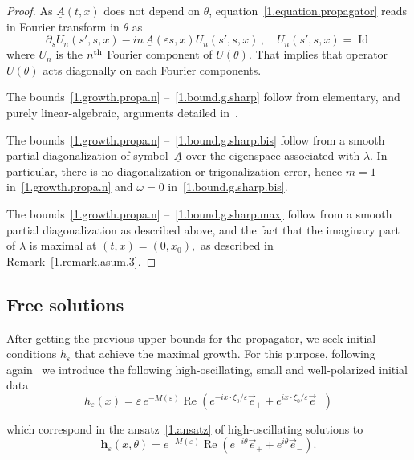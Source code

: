 \documentclass[10pt]{amsart}
\theoremstyle{definition}
\theoremstyle{plain}
\newcommand*\e{\varepsilon}
\newcommand{\dptl}{\partial}%
\newcommand*\h{{\mathbf h}}
\newcommand*\und{\underline}
\DeclareMathOperator{\Id}{Id}
\DeclareMathOperator{\Ret}{Re}
\begin{document}
\begin{proof}
As $\und{A}(t,x)$ does not depend on $\theta$, equation~\eqref{1.equation.propagator} reads in Fourier transform in $\theta$ as
\[
\dptl_{s}U_n(s',s,x) - in\,\und{A}(\e s, x) U_n(s',s,x)\,, \quad U_n(s',s,x) = {\Id}
\]
where $U_n$ is the $n^{\rm th}$ Fourier component of $U(\theta)$. That implies that operator $U(\theta)$ acts diagonally on each Fourier components.

The bounds~\eqref{1.growth.propa.n} --~\eqref{1.bound.g.sharp} follow from elementary, and purely linear-algebraic, arguments detailed in~\cite[Sections~(4.2) and (4.3)]{lerner2015onset}.

The bounds~\eqref{1.growth.propa.n} --~\eqref{1.bound.g.sharp.bis} follow from a smooth partial diagonalization of symbol~$\und{A}$ over the eigenspace associated with $\lambda$. In particular, there is no diagonalization or trigonalization error, hence $m = 1$ in~\eqref{1.growth.propa.n} and $\omega = 0$ in~\eqref{1.bound.g.sharp.bis}.

The bounds~\eqref{1.growth.propa.n} --~\eqref{1.bound.g.sharp.max} follow from a smooth partial diagonalization as described above, and the fact that the imaginary part of $\lambda$ is maximal at $(t,x) = (0,x_0),$ as described in Remark~\ref{1.remark.asum.3}.
\end{proof}



\subsection{Free solutions}\label{1.subsection.free.solution}



After getting the previous upper bounds for the propagator, we seek initial conditions $h_{\e}$ that achieve the maximal growth. For this purpose, following again~\cite{metivier2005remarks} we introduce the following high-oscillating, small and well-polarized initial data
\begin{equation}\label{1.def.initial.data}
h_{\e}(x) = \e\,e^{-M(\e)} {\Ret}\left(e^{-ix\cdot\xi_0/\e} \vec{e}_{+} + e^{ix\cdot\xi_0/\e} \vec{e}_{-}\right)
\end{equation}

\noindent which correspond in the ansatz~\eqref{1.ansatz} of high-oscillating solutions to
\begin{equation}\label{1.def.initial.data.ansatz}
\h_{\e}(x,\theta) = e^{-M(\e)} {\Ret}\left(e^{-i\theta} \vec{e}_{+} + e^{i\theta} \vec{e}_{-}\right).
\end{equation}
\end{document}
